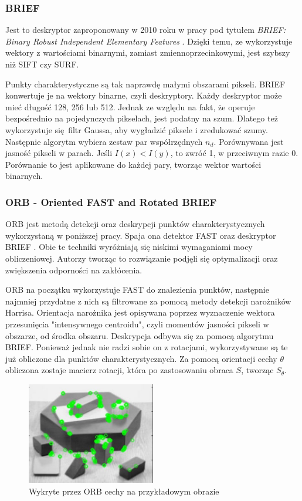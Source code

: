\documentclass[12pt,twoside,polish]{article}
\begin{document}
\subsubsection{BRIEF}

Jest to deskryptor zaproponowany w 2010 roku w pracy pod tytułem \emph{BRIEF: Binary Robust Independent Elementary Features} \cite{brief}. Dzięki temu, ze wykorzystuje wektory z wartościami binarnymi, zamiast zmiennoprzecinkowymi, jest szybszy niż SIFT czy SURF.

Punkty charakterystyczne są tak naprawdę małymi obszarami pikseli. BRIEF konwertuje je na wektory binarne, czyli deskryptory. Każdy deskryptor może mieć długość 128, 256 lub 512. Jednak ze względu na fakt, że operuje bezpośrednio na pojedynczych pikselach, jest podatny na szum. Dlatego też wykorzystuje się filtr Gaussa, aby wygładzić piksele i zredukować szumy. Następnie algorytm wybiera zestaw par współrzędnych $n_d$. Porównywana jest jasność pikseli w parach. Jeśli $I(x) < I(y)$, to zwróć 1, w przeciwnym razie 0. Porównanie to jest aplikowane do każdej pary, tworząc wektor wartości binarnych.

\subsubsection[ORB]{ORB - Oriented FAST and Rotated BRIEF}

ORB jest metodą detekcji oraz deskrypcji punktów charakterystycznych wykorzystaną w poniższej pracy. Spaja ona detektor FAST oraz deskryptor BRIEF \cite{orb_doc}. Obie te techniki wyróżniają się niskimi wymaganiami mocy obliczeniowej. Autorzy tworząc to rozwiązanie podjęli się optymalizacji oraz zwiększenia odporności na zakłócenia.

ORB na początku wykorzystuje FAST do znalezienia punktów, następnie najmniej przydatne z nich są filtrowane za pomocą metody detekcji narożników Harrisa. Orientacja narożnika jest opisywana poprzez wyznaczenie wektora przesunięcia "intensywnego centroidu", czyli momentów jasności pikseli w obszarze, od środka obszaru. Deskrypcja odbywa się za pomocą algorytmu BRIEF. Ponieważ jednak nie radzi sobie on z rotacjami, wykorzystywane są te już obliczone dla punktów charakterystycznych. Za pomocą orientacji cechy $\theta$ obliczona zostaje macierz rotacji, która po zastosowaniu obraca $S$, tworząc $ S_\theta $.

\begin{figure}
	\centering
		\includegraphics[width=0.5\textwidth]{orb_kp}
	\caption{Wykryte przez ORB cechy na przykładowym obrazie \cite{orbkp}}
\end{figure}
\end{document}
